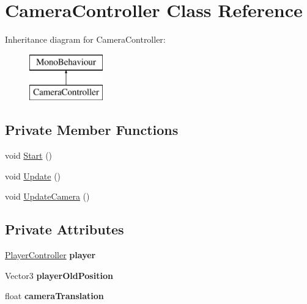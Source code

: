 \hypertarget{class_camera_controller}{}\section{Camera\+Controller Class Reference}
\label{class_camera_controller}
Inheritance diagram for Camera\+Controller\+:\begin{figure}[H]
\begin{center}
\leavevmode
\includegraphics[height=2.000000cm]{class_camera_controller}
\end{center}
\end{figure}
\subsection*{Private Member Functions}
\begin{DoxyCompactItemize}
\item 
void \mbox{\hyperlink{class_camera_controller_ad4a238c6f7db3ee003302a245d860860}{Start}} ()
\item 
void \mbox{\hyperlink{class_camera_controller_a7c4f486f4bcbd1d54a346fdce9707bd5}{Update}} ()
\item 
void \mbox{\hyperlink{class_camera_controller_ab397f3c39a112546283ad6b63fbf04ec}{Update\+Camera}} ()
\end{DoxyCompactItemize}
\subsection*{Private Attributes}
\begin{DoxyCompactItemize}
\item 
\mbox{\label{class_camera_controller_ad203a3ed21fdf7dd5f7660aa3efb4505}} 
\mbox{\hyperlink{class_player_controller}{Player\+Controller}} {\bfseries player}
\item 
\mbox{\label{class_camera_controller_aade8a2c37c7e3fce762890764ca8f4c8}} 
Vector3 {\bfseries player\+Old\+Position}
\item 
\mbox{\label{class_camera_controller_ad58dce0799fed1a0b63c7552f8abf028}} 
float {\bfseries camera\+Translation}
\end{DoxyCompactItemize}


